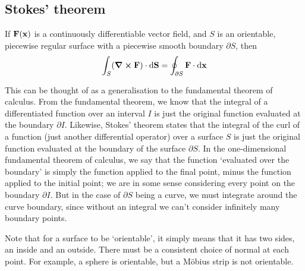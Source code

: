 \subsection{Stokes' theorem}
\begin{proposition}
	If \(\vb F(\vb x)\) is a continuously differentiable vector field, and \(S\) is an orientable, piecewise regular surface with a piecewise smooth boundary \(\partial S\), then
	\[
		\int_S (\curl{\vb F}) \cdot \dd \vb S = \oint_{\partial S} \vb F\cdot \dd{\vb x}
	\]
\end{proposition}
This can be thought of as a generalisation to the fundamental theorem of calculus.
From the fundamental theorem, we know that the integral of a differentiated function over an interval \(I\) is just the original function evaluated at the boundary \(\partial I\).
Likewise, Stokes' theorem states that the integral of the curl of a function (just another differential operator) over a surface \(S\) is just the original function evaluated at the boundary of the surface \(\partial S\).
In the one-dimensional fundamental theorem of calculus, we say that the function `evaluated over the boundary' is simply the function applied to the final point, minus the function applied to the initial point; we are in some sense considering every point on the boundary \(\partial I\).
But in the case of \(\partial S\) being a curve, we must integrate around the curve boundary, since without an integral we can't consider infinitely many boundary points.

Note that for a surface to be `orientable', it simply means that it has two sides, an inside and an outside.
There must be a consistent choice of normal at each point.
For example, a sphere is orientable, but a M\"obius strip is not orientable.

